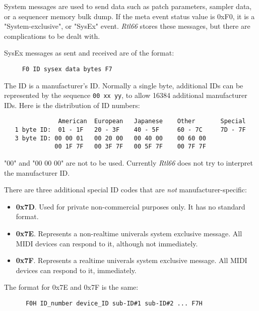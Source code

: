    System messages are used to send data such as patch parameters, sampler
   data, or a sequencer memory bulk dump.
   If the meta event status value is 0xF0, it is a "System-exclusive",
   or "SysEx" event.
   \textsl{Rtl66} stores these messages, but there are complications
   to be dealt with.

   SysEx messages as sent and received are of the format:

   \begin{verbatim}
     F0 ID sysex data bytes F7
   \end{verbatim}

   The ID is a manufacturer's ID. Normally a single byte, additional IDs can be
   represented by the sequence \texttt{00 xx yy}, to allow 16384 additional
   manufacturer IDs. Here is the distribution of ID numbers:

   \begin{verbatim}
               American  European   Japanese    Other       Special
   1 byte ID:  01 - 1F   20 - 3F    40 - 5F     60 - 7C     7D - 7F
   3 byte ID: 00 00 01   00 20 00   00 40 00    00 60 00
              00 1F 7F   00 3F 7F   00 5F 7F    00 7F 7F
   \end{verbatim}

   "00" and "00 00 00" are not to be used.
   Currently \textsl{Rtl66} does not try to interpret the manufacturer ID.

   There are three additional special ID codes that are \textsl{not}
   manufacturer-specific:

   \begin{itemize}
      \item \textbf{0x7D}.
         Used for private non-commercial purposes only.
         It has no standard format.
      \item \textbf{0x7E}.
         Represents a non-realtime univerals system exclusive message.
         All MIDI devices can respond to it, although not immediately.
      \item \textbf{0x7F}.
         Represents a realtime univerals system exclusive message.
         All MIDI devices can respond to it, immediately.
   \end{itemize}

   The format for 0x7E and 0x7F is the same:

   \begin{verbatim}
      F0H ID_number device_ID sub-ID#1 sub-ID#2 ... F7H
   \end{verbatim}

